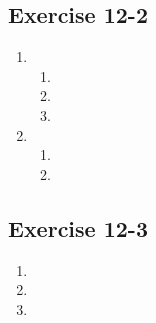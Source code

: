 \subsection{Exercise 12-2} %
\begin{enumerate}[noitemsep, label=\textbf{\arabic*}. ] 
\item %
 \begin{enumerate}[noitemsep, label=\textbf{(\alph*)} ]
  \item 
\item 
\item
 \end{enumerate}


\item %
 \begin{enumerate}[noitemsep, label=\textbf{(\alph*)} ]
\item %
\item %
\end{enumerate}


 \end{enumerate}       
\subsection{Exercise 12-3} %
\begin{enumerate}[itemsep=6pt, label=\textbf{\arabic*}. ] 
\item
\item
\item
\end{enumerate}
